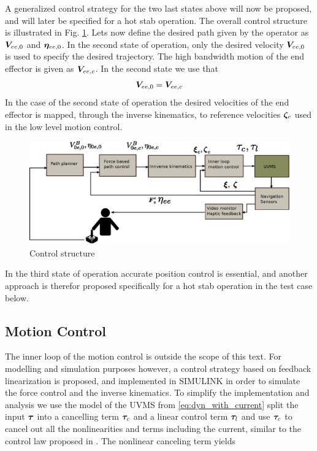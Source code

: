 A generalized control strategy for the two last states above will now  be proposed, and will later be specified for a hot stab operation. The overall control structure is illustrated in Fig. \ref{fig:control_structure}. Lets now define the desired path given by the operator as $\boldsymbol V_{ee,0}$ and $\boldsymbol \eta_{ee,0}$. In the second state of operation, only the desired velocity $\boldsymbol V_{ee,0}$ is used to specify the desired trajectory. The high bandwidth motion of the end effector is given as $\boldsymbol V_{ee,c}$. In the second state we use that 
$$\boldsymbol V_{ee,0} = \boldsymbol V_{ee,c} $$ 
In the case of the second state of operation the desired velocities of the end effector is mapped, through the inverse kinematics, to reference velocities $\boldsymbol \zeta_{c}$ used in the low level motion control.
\begin{figure}[h!]
	\centering
	\includegraphics[scale=0.9]{./figures/control_structure.eps}
	\caption{Control structure}
	\label{fig:control_structure}
\end{figure}
In the third state of operation accurate position control is essential, and another approach is therefor proposed specifically for a hot stab operation in the test case below. 

\subsection{Motion Control}
The inner loop of the motion control is outside the scope of this text. For modelling and simulation purposes however, a control strategy based on feedback linearization is proposed, and implemented in SIMULINK in order to 
simulate the force control and the inverse kinematics. To simplify the implementation and analysis we use the model of the UVMS from \eqref{eq:dyn_with_current} split the input $\boldsymbol \tau$ into a cancelling term $\boldsymbol \tau_c$ and a 
linear control term $\boldsymbol \tau_l$ and use $\boldsymbol \tau_c$ to cancel out all the nonlinearities and terms including the current, similar to the control law proposed in \cite{foss_schjolberg_modelling}. The nonlinear canceling term yields

